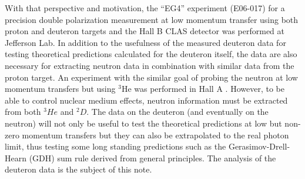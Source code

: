 
With that perspective and motivation, the ``EG4'' experiment (E06-017) %
for a precision double polarization measurement at low momentum transfer %
  using both proton and deuteron targets and the Hall B CLAS detector was performed at Jefferson Lab. 
In addition to the usefulness of the measured %
deuteron data for testing %
theoretical predictions calculated for the deuteron itself, the data %
are also necessary for extracting neutron data%
 in combination with %
similar data from the proton target. %
An experiment with the similar %
goal of probing the neutron at low momentum transfers but using $^3$He was performed in Hall A \cite{propE97_110}. %
However, to be able to control nuclear medium effects, neutron information must be extracted from both $^3He$ and $^2D$.
The data on the deuteron (and eventually on the neutron) will not only be useful to test the theoretical predictions at low but non-zero %
momentum transfers but they can also be %
extrapolated to the %
real photon %
limit, thus %
testing some long standing predictions such as the Gerasimov-Drell-Hearn (GDH) sum rule \cite{GDHsumRule0,GDHsumRule} %
derived from general principles.
The analysis of the deuteron data is the subject of this note. %

